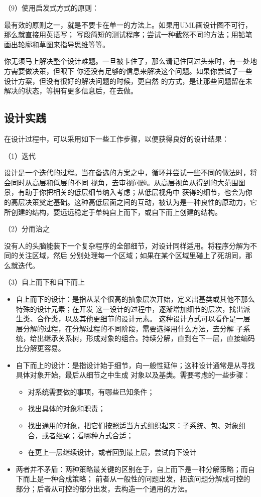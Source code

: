 \documentclass{article}
\begin{document}
\par
（9）使用启发式方式的原则：
\par
最有效的原则之一，就是不要卡在单一的方法上。如果用UML画设计图不可行，那么就直接用英语写；
写段简短的测试程序；尝试一种截然不同的方法；用铅笔画出轮廓和草图来指导思维等等。
\par
你无须马上解决整个设计难题。一旦被卡住了，那么请记住回过头来时，有一处地方需要做决策，但眼下
你还没有足够的信息来解决这个问题。如果你尝试了一些设计方案，但没有很好的解决问题的时候，更自然
的方式，是让那些问题留在未解决的状态，等拥有更多信息后，在去做。

\subsection{设计实践}
在设计过程中，可以采用如下一些工作步骤，以便获得良好的设计结果：
\par
（1）迭代
\par
设计是一个迭代的过程。当在备选的方案之中，循环并尝试一些不同的做法时，将会同时从高层和低层的不同
视角，去审视问题。从高层视角从得到的大范围图景，有助于你把相关的低层细节纳入考虑；从低层视角中
获得的细节，也会为你的高层决策奠定基础。这种高低层面之间的互动，被认为是一种良性的原动力，它
所创建的结构，要远远稳定于单纯自上而下，或自下而上创建的结构。

\par
（2）分而治之
\par
没有人的头脑能装下一个复杂程序的全部细节，对设计同样适用。将程序分解为不同的关注区域，然后
分别处理每一个区域；如果在某个区域里碰上了死胡同，那么就迭代。

\par
（3）自上而下和自下而上
\begin{itemize}
    \item 自上而下的设计：是指从某个很高的抽象层次开始，定义出基类或其他不那么特殊的设计元素；在开发
    这一设计的过程中，逐渐增加细节的层次，找出派生类、合作类，以及其他更细节的设计元素。
    这种设计方式可以看作是一层层分解的过程，在分解过程的不同阶段，需要选择用什么方法，去分解
    子系统，给出继承关系树，形成对象的组合。持续分解，直到在下一层，直接编码比分解更容易。
    \item 自下而上的设计：是指设计始于细节，向一般性延伸；这种设计通常是从寻找具体对象开始，最后从细节之中生成
    对象以及基类。需要考虑的一些步骤：
    \begin{itemize}
        \item 对系统需要做的事项，有哪些已知条件；
        \item 找出具体的对象和职责；
        \item 找出通用的对象，把它们按照适当方式组织起来：子系统、包、对象组合，或者继承；看哪种方式合适；
        \item 在更上一层继续设计，或者回到最上层，尝试向下设计
    \end{itemize}
    \item 两者并不矛盾：两种策略最关键的区别在于，自上而下是一种分解策略；而自下而上是一种合成策略；
    前者从一般性的问题出发，把该问题分解成可控的部分；后者从可控的部分出发，去构造一个通用的方法。
\end{itemize}
\end{document}
